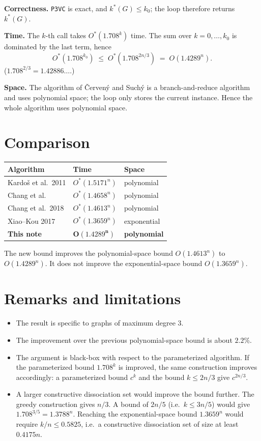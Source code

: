 \documentclass[11pt]{article}
\begin{document}
\textbf{Correctness.} \texttt{P3VC} is exact, and $k^*(G) \le k_0$; the loop therefore
returns $k^*(G)$.

\textbf{Time.} The $k$-th call takes $O^*(1.708^k)$ time. The sum over
$k=0,\dots,k_0$ is dominated by the last term, hence
\[
  O^*(1.708^{k_0}) \;\le\; O^*(1.708^{2n/3}) \;=\; O(1.4289^n).
\]
($1.708^{2/3} = 1.42886\ldots$.)

\textbf{Space.} The algorithm of \v{C}erven\'y and Such\'y is a branch-and-reduce
algorithm and uses polynomial space; the loop only stores the current instance. Hence
the whole algorithm uses polynomial space.

\section{Comparison}

\begin{center}
\begin{tabular}{lll}
\hline
Algorithm & Time & Space \\
\hline
Kardoš et al.\ 2011 & $O^*(1.5171^n)$ & polynomial \\
Chang et al. & $O^*(1.4658^n)$ & polynomial \\
Chang et al.\ 2018 & $O^*(1.4613^n)$ & polynomial \\
Xiao--Kou 2017 & $O^*(1.3659^n)$ & exponential \\
\textbf{This note} & $\boldsymbol{O(1.4289^n)}$ & \textbf{polynomial} \\
\hline
\end{tabular}
\end{center}

The new bound improves the polynomial-space bound $O(1.4613^n)$ to $O(1.4289^n)$.
It does not improve the exponential-space bound $O(1.3659^n)$.

\section{Remarks and limitations}

\begin{itemize}
\item The result is specific to graphs of maximum degree 3.
\item The improvement over the previous polynomial-space bound is about $2.2\%$.
\item The argument is black-box with respect to the parameterized algorithm. If the
      parameterized bound $1.708^k$ is improved, the same construction improves
      accordingly: a parameterized bound $c^k$ and the bound $k \le 2n/3$ give
      $c^{2n/3}$.
\item A larger constructive dissociation set would improve the bound further. The greedy
      construction gives $n/3$. A bound of $2n/5$ (i.e.\ $k \le 3n/5$) would give
      $1.708^{3/5} = 1.3788^n$. Reaching the exponential-space bound $1.3659^n$ would
      require $k/n \le 0.5825$, i.e.\ a constructive dissociation set of size at least
      $0.4175n$.
\end{itemize}
\end{document}
